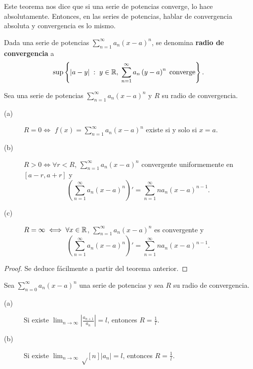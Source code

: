 \begin{observation}
\normalfont Este teorema nos dice que si una serie de potencias converge, lo hace absolutamente. Entonces, en las series de potencias, hablar de convergencia absoluta y convergencia es lo mismo.
\end{observation}
\begin{fdefinition}
\normalfont Dada una serie de potencias $\displaystyle \sum^{\infty}_{n = 1}a_{n}\left(x-a\right)^{n} $, se denomina \textbf{radio de convergencia} a 
\[\sup \left\{ \left|a-y\right| \; : \; y \in \mathbb{R}, \; \sum^{\infty}_{n = 1}a_{n}\left(y-a\right)^{n} \; \text{converge}\right\}  .\]
\end{fdefinition}
\begin{ftheorem}[]
\normalfont Sea una serie de potencias $\displaystyle \sum^{\infty}_{n = 1}a_{n}\left(x-a\right)^{n} $ y $\displaystyle R $ su radio de convergencia.
\begin{description}
\item[(a)] $\displaystyle R = 0 \iff  $ $\displaystyle f\left(x\right) = \sum^{\infty}_{n = 1}a_{n}\left(x-a\right)^{n} $ existe si y solo si $\displaystyle x = a $.
\item[(b)] $\displaystyle  R > 0 \iff \forall r < R$, $\displaystyle \sum^{\infty}_{n = 1}a_{n}\left(x-a\right)^{n} $ convergente uniformemente en $\displaystyle \left[a - r, a + r\right]  $ y 
	\[ \left(\sum^{\infty}_{n = 1}a_{n}\left(x-a\right)^{n}\right)' = \sum^{\infty}_{n = 1}n a_{n}\left(x-a\right)^{n-1} .\]
\item[(c)] $\displaystyle R = \infty \iff \forall x \in \mathbb{R} $, $\displaystyle \sum^{\infty}_{ n=1}a_{n}\left(x-a\right)^{n} $ es convergente y 
	\[ \left(\sum^{\infty}_{n = 1}a_{n}\left(x-a\right)^{n}\right)' = \sum^{\infty}_{n = 1}n a_{n}\left(x-a\right)^{n-1} .\]
\end{description}
\end{ftheorem}
\begin{proof}
Se deduce fácilmente a partir del teorema anterior.
\end{proof}
\begin{fcolorary}[]
\normalfont Sea $\displaystyle \sum^{\infty}_{n = 0}a_{n}\left(x-a\right)^{n} $ una serie de potencias y sea $\displaystyle R $ su radio de convergencia.
\begin{description}
\item[(a)] Si existe $\displaystyle \lim_{n \to \infty} \left|\frac{a_{n+1}}{a_{n}}\right| = l $, entonces $\displaystyle R = \frac{1}{l} $. 
\item[(b)] Si existe $\displaystyle \lim_{n \to \infty} \sqrt\left[n\right] { \left|a_{n}\right|} = l$, entonces $\displaystyle R = \frac{1}{l} $.
\end{description}
\end{fcolorary}
